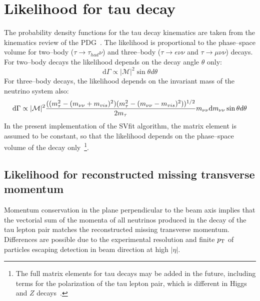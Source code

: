 \section{Likelihood for tau decay}

The probability density functions for the tau decay kinematics are taken from
the kinematics review of the PDG~\cite{PDG}.  The likelihood is proportional to
the phase--space volume for two--body ($\tau \to \tau_{had} \nu$) and
three--body ($\tau \to e \nu\nu$ and $\tau \to \mu \nu\nu$) decays.  For
two--body decays the likelihood depends on the decay angle $\theta$ only:
\begin{equation*}
\mathrm{d}\Gamma \propto |\mathcal{M}|^2 \sin \theta d \theta
\label{eq:pdfKineHadronic}
\end{equation*}
For three--body decays, the likelihood depends on the invariant mass of the
neutrino system also:
\begin{equation}
\mathrm{d}\Gamma \propto |\mathcal{M}|^2 
\frac{((m_{\tau}^2 - (m_{\nu\nu} + m_{vis})^2)(m_{\tau}^2 - (m_{\nu\nu} - m_{vis})^2))^{1/2}}
{2 m_{\tau}} 
m_{\nu\nu}
\mathrm{d}m_{\nu\nu}
\sin \theta d\theta 
\label{eq:pdfKineLeptonic}
\end{equation}
In the present implementation of the SVfit algorithm, the matrix element is
assumed to be constant, so that the likelihood depends on the phase--space
volume of the decay only~\footnote{The full matrix elements for tau decays may
be added in the future, including terms for the polarization of the tau lepton
pair, which is different in Higgs and $Z$ decays~\cite{tauDecayPolarization}.
}.


\subsection{Likelihood for reconstructed missing transverse momentum}

Momentum conservation in the plane perpendicular to the beam axis implies that
the vectorial sum of the momenta of all neutrinos produced in the decay of the
tau lepton pair matches the reconstructed missing transverse momentum.
Differences are possible due to the experimental resolution and finite $p_{\mathrm{T}}$
of particles escaping detection in beam direction at high $\left| \eta \right|$.

